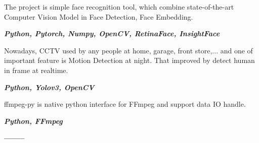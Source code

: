 \documentclass[10pt,a4paper,ragged2e,withhyper]{altacv}
\begin{document}
\medskip

\divider

\medskip


\begin{minipage}{\linewidth}
\justifying
The project is simple face recognition tool, which combine state-of-the-art Computer Vision Model in Face Detection, Face Embedding.
\smallskip

\textit{\textbf{Python, Pytorch, Numpy, OpenCV, RetinaFace, InsightFace}}
\end{minipage}

\medskip

\divider

\medskip

\begin{minipage}{\linewidth}
\justifying
Nowadays, CCTV used by any people at home, garage, front store,... and one of important feature is Motion Detection at night. That improved by detect human in frame at realtime.
\smallskip

\textit{\textbf{Python, Yolov3, OpenCV}}
\end{minipage}

\medskip

\divider

\medskip

\begin{minipage}{\linewidth}
	\justifying
	ffmpeg-py is native python interface for FFmpeg and support data IO handle.
	\smallskip
	
	\textit{\textbf{Python, FFmpeg}}
\end{minipage}

\bigskip
\begin{minipage}{\linewidth}
	\centering
	\textbf{\color{accent}--------}
\end{minipage}
	
\end{document}
